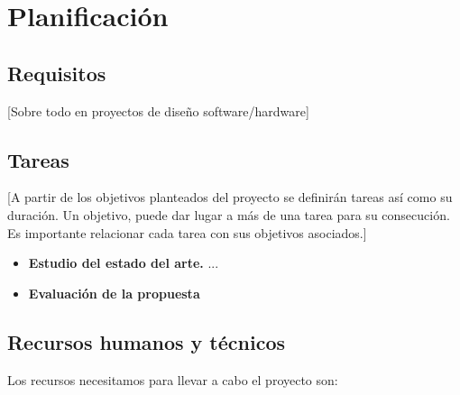 \chapter{Planificación}\label{cap:planif}

\section{Requisitos}
[Sobre todo en proyectos de diseño software/hardware]

\section{Tareas}
[A partir de los objetivos planteados del proyecto se definirán tareas así como su duración. Un objetivo, puede dar lugar a más de una tarea para su consecución. Es importante relacionar cada tarea con sus objetivos asociados.]

\begin{itemize}
    \item \textbf{Estudio del estado del arte.} ...
    \item \textbf{Evaluación de la propuesta} 
\end{itemize}

\section{Recursos humanos y técnicos}

Los recursos necesitamos para llevar a cabo el proyecto son:

